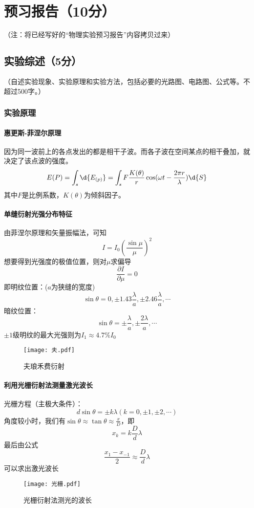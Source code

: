 \documentclass[yuxi]{../template/Report}%
\begin{document}
\maketitle%

\section{预习报告（10分）}
（注：将已经写好的“物理实验预习报告”内容拷贝过来）

\subsection{实验综述（5分）}
（自述实验现象、实验原理和实验方法，包括必要的光路图、电路图、公式等。不超过500字。）
\subsubsection{实验原理}
\paragraph{惠更斯-菲涅尔原理}
因为同一波前上的各点发出的都是相干子波。而各子波在空间某点的相干叠加，就决定了该点波的强度。
\[
E(P) = \int_s \d{E_{(p)}} = \int_s F\frac{K(\theta)}{r}\cos(\omega t - \frac{2 \pi r}{\lambda})\d{S}
\]
其中$F$是比例系数，$K(\theta)$为倾斜因子。
\paragraph{单缝衍射光强分布特征}
由菲涅尔原理和矢量振幅法，可知\[
I = I_0 (\frac{\sin \mu}{\mu})^2
\]
想要得到光强度的极值位置，则对$\mu$求偏导
\[
\frac{\partial I}{\partial \mu} = 0
\]
即明纹位置：($a$为狭缝的宽度)
\[
\sin\theta = 0, \pm 1.43\frac{\lambda}{a}, \pm 2.46\frac{\lambda}{a}, \cdots
\]
暗纹位置：
\[
\sin\theta = \pm \frac{\lambda}{a}, \pm \frac{2\lambda}{a}, \cdots
\]
$\pm 1$级明纹的最大光强则为$I_1 \approx 4.7\% I_0$

\begin{figure}[H]
    \centering
    \texttt{[image: 夫.pdf]}
    \caption{夫琅禾费衍射}
\end{figure}

\paragraph{利用光栅衍射法测量激光波长}
光栅方程（主极大条件）：
\[
d\sin \theta = \pm k\lambda(k = 0, \pm 1, \pm 2, \cdots)
\]
角度较小时，我们有$\sin\theta \approx \tan \theta \approx \frac{x}{D}$，即
\[
x_k = k\frac{D}{d}\lambda
\]
最后由公式\[\frac{x_1 - x_{-1}}{2} \approx \frac{D}{d}\lambda\]
可以求出激光波长
\begin{figure}[H]
    \centering
    \texttt{[image: 光栅.pdf]}
    \caption{光栅衍射法测光的波长}
\end{figure}
\end{document}
